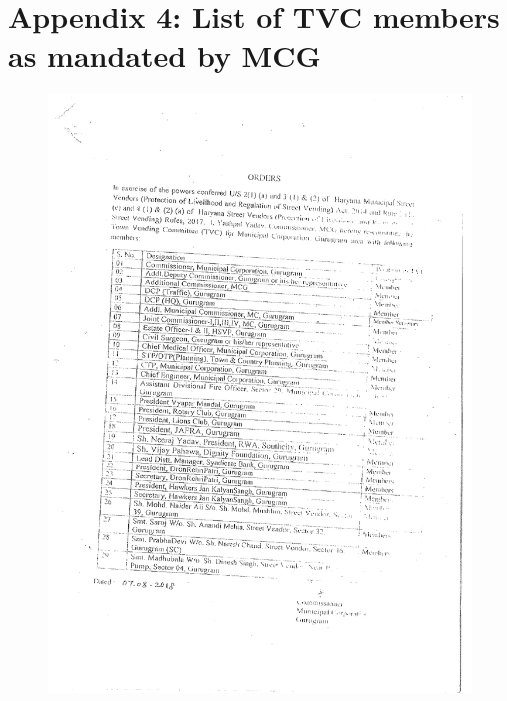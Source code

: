 \documentclass[a4paper, 12pt, twoside]{article}
\begin{document}
{{\section*{Appendix 4: List of TVC members as mandated by MCG}
\label{sec: Appendix 6}
\begin{figure}[h]
\centering
\includegraphics[width=5.1in]{Appendix6.pdf}
\end{figure}

\newpage
}}
\end{document}
